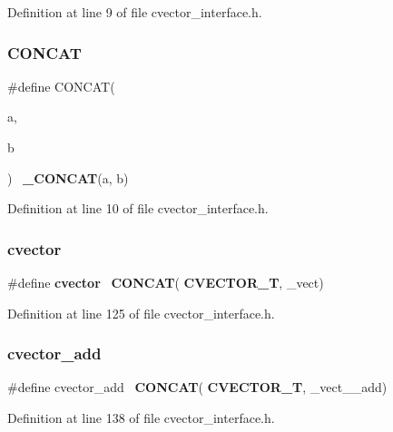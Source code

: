 Definition at line 9 of file cvector\+\_\+interface.\+h.

\mbox{\label{cvector__interface_8h_a88fa737059e67b4b17ec980e5877361e}} 
\subsubsection{C\+O\+N\+C\+AT}
{\footnotesize\ttfamily \#define C\+O\+N\+C\+AT(\begin{DoxyParamCaption}\item[{}]{a,  }\item[{}]{b }\end{DoxyParamCaption})~\textbf{ \+\_\+\+C\+O\+N\+C\+AT}(a, b)}



Definition at line 10 of file cvector\+\_\+interface.\+h.

\mbox{\label{cvector__interface_8h_a2d03a0c8fc8c754ba9895af080296662}} 
\subsubsection{cvector}
{\footnotesize\ttfamily \#define \textbf{ cvector}~\textbf{ C\+O\+N\+C\+AT}(\textbf{ C\+V\+E\+C\+T\+O\+R\+\_\+T}, \+\_\+vect)}



Definition at line 125 of file cvector\+\_\+interface.\+h.

\mbox{\label{cvector__interface_8h_a9ed34c19cbe296317980c68d1797d146}} 
\subsubsection{cvector\+\_\+add}
{\footnotesize\ttfamily \#define cvector\+\_\+add~\textbf{ C\+O\+N\+C\+AT}(\textbf{ C\+V\+E\+C\+T\+O\+R\+\_\+T}, \+\_\+vect\+\_\+\+\_\+add)}



Definition at line 138 of file cvector\+\_\+interface.\+h.

\mbox{\label{cvector__interface_8h_a453850dca99e44eb36265c3bf3f9f73e}} 
